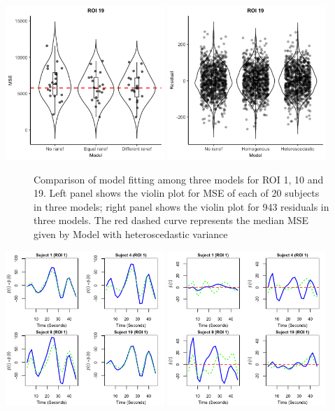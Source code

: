 \includegraphics[width=0.45\textwidth]{ROI19_voilin.png}
\includegraphics[width=0.45\textwidth]{ROI19_voilin_resi.png}

\begin{figure}[h!]
\centering
\caption{Comparison of model fitting among three models for ROI 1, 10 and 19.  Left panel shows the violin plot for MSE of each of 20 subjects in three models; right panel shows the violin plot for 943 residuals in three models. The red dashed curve represents the median MSE given by Model with heteroscedastic variance}
\label{MSE_voilin}
\end{figure}

\includegraphics[width=0.45\textwidth]{ROI1_sub4_betat.png}
\includegraphics[width=0.45\textwidth]{ROI1_sub4_betait.png}

